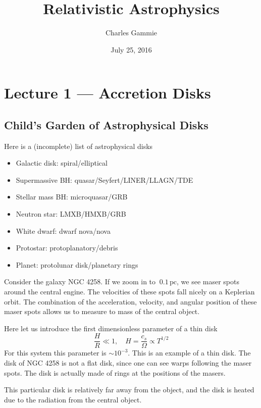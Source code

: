 \documentclass[letterpaper, 11pt]{article}
\numberwithin{equation}{section}
\numberwithin{figure}{section}
\begin{document}
\title{Relativistic Astrophysics}
\author{Charles Gammie}
\date{July 25, 2016}

\maketitle

\section{Lecture 1 --- Accretion Disks}

\subsection{Child's Garden of Astrophysical Disks}

Here is a (incomplete) list of astrophysical disks
\begin{itemize}
\item Galactic disk: spiral/elliptical
\item Supermassive BH: quasar/Seyfert/LINER/LLAGN/TDE
\item Stellar mass BH: microquasar/GRB
\item Neutron star: LMXB/HMXB/GRB
\item White dwarf: dwarf nova/nova
\item Protostar: protoplanatory/debris
\item Planet: protolunar disk/planetary rings
\end{itemize}

Consider the galaxy NGC 4258. If we zoom in to $~0.1\,\mathrm{pc}$, we see maser
spots around the central engine. The velocities of these spots fall nicely on a
Keplerian orbit. The combination of the acceleration, velocity, and angular
position of these maser spots allows us to measure to mass of the central
object.

Here let us introduce the first dimensionless parameter of a thin disk
\begin{equation}
  \label{eq:1}
  \frac{H}{R}\ll 1, \quad H = \frac{c_s}{\Omega} \propto T^{1/2}
\end{equation}
For this system this parameter is $\sim 10^{-3}$. This is an example of a thin
disk. The disk of NGC 4258 is not a flat disk, since one can see warps following
the maser spots. The disk is actually made of rings at the positions of the
masers.

This particular disk is relatively far away from the object, and the disk is
heated due to the radiation from the central object.
\end{document}
